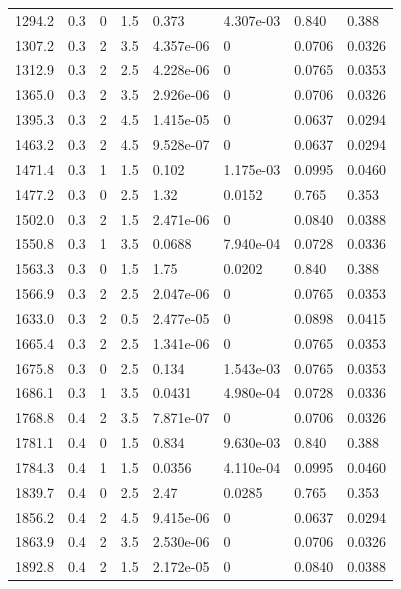 \documentclass[preview]{standalone}
\begin{document}
{{{\begin{tabular}{L{1.2cm}C{1.2cm} C{0.3cm}C{0.5cm} C{1.4cm}C{1.4cm} C{1.4cm}C{1.4cm}}
  1294.2  &   0.3  & 0     & 1.5 &  0.373  & 4.307e-03  & 0.840 &  0.388   \\ 
  1307.2  &   0.3  & 2     & 3.5 &  4.357e-06  & 0  & 0.0706 &  0.0326   \\ 
  1312.9  &   0.3  & 2     & 2.5 &  4.228e-06  & 0  & 0.0765 &  0.0353   \\ 
  1365.0  &   0.3  & 2     & 3.5 &  2.926e-06  & 0  & 0.0706 &  0.0326   \\ 
  1395.3  &   0.3  & 2     & 4.5 &  1.415e-05  & 0  & 0.0637 &  0.0294   \\ 
  1463.2  &   0.3  & 2     & 4.5 &  9.528e-07  & 0  & 0.0637 &  0.0294   \\ 
  1471.4  &   0.3  & 1     & 1.5 &  0.102  & 1.175e-03  & 0.0995 &  0.0460   \\ 
  1477.2  &   0.3  & 0     & 2.5 &  1.32  & 0.0152  & 0.765 &  0.353   \\ 
  1502.0  &   0.3  & 2     & 1.5 &  2.471e-06  & 0  & 0.0840 &  0.0388   \\ 
  1550.8  &   0.3  & 1     & 3.5 &  0.0688  & 7.940e-04  & 0.0728 &  0.0336   \\ 
  1563.3  &   0.3  & 0     & 1.5 &  1.75  & 0.0202  & 0.840 &  0.388   \\ 
  1566.9  &   0.3  & 2     & 2.5 &  2.047e-06  & 0  & 0.0765 &  0.0353   \\ 
  1633.0  &   0.3  & 2     & 0.5 &  2.477e-05  & 0  & 0.0898 &  0.0415   \\ 
  1665.4  &   0.3  & 2     & 2.5 &  1.341e-06  & 0  & 0.0765 &  0.0353   \\ 
  1675.8  &   0.3  & 0     & 2.5 &  0.134  & 1.543e-03  & 0.0765 &  0.0353   \\ 
  1686.1  &   0.3  & 1     & 3.5 &  0.0431  & 4.980e-04  & 0.0728 &  0.0336   \\ 
  1768.8  &   0.4  & 2     & 3.5 &  7.871e-07  & 0  & 0.0706 &  0.0326   \\ 
  1781.1  &   0.4  & 0     & 1.5 &  0.834  & 9.630e-03  & 0.840 &  0.388   \\ 
  1784.3  &   0.4  & 1     & 1.5 &  0.0356  & 4.110e-04  & 0.0995 &  0.0460   \\ 
  1839.7  &   0.4  & 0     & 2.5 &  2.47  & 0.0285  & 0.765 &  0.353   \\ 
  1856.2  &   0.4  & 2     & 4.5 &  9.415e-06  & 0  & 0.0637 &  0.0294   \\ 
  1863.9  &   0.4  & 2     & 3.5 &  2.530e-06  & 0  & 0.0706 &  0.0326   \\ 
  1892.8  &   0.4  & 2     & 1.5 &  2.172e-05  & 0  & 0.0840 &  0.0388   \\ 

\end{tabular}}}}
\end{document}
